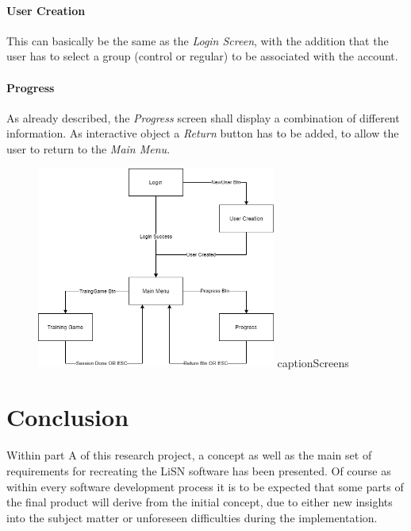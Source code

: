 \documentclass[a4paper,11pt]{article}%
\renewcommand{\\}{\vspace*{0.5\baselineskip} \newline}
\begin{document}
\paragraph{User Creation} This can basically be the same as the \textit{Login Screen}, with the addition that the user has to select a group (control or regular) to be associated with the account.

\paragraph{Progress} As already described, the \textit{Progress} screen shall display a combination of different information. As interactive object a \textit{Return} button has to be added, to allow the user to return to the \textit{Main Menu}.

\vspace{5mm}
\begin{figure}[h!]
\centering
\includegraphics[width=0.7\textwidth]{screens2.png}
caption{Screens}
\label{fig:screens}
\vspace{3mm}
\end{figure}



\section{Conclusion}
\label{sec:conclusion}
Within part A of this research project, a concept as well as the main set of requirements for recreating the \ac{LiSN} software has been presented. Of course as within every software development process it is to be expected that some parts of the final product will derive from the initial concept, due to either new insights into the subject matter or unforeseen difficulties during the implementation.
\end{document}
